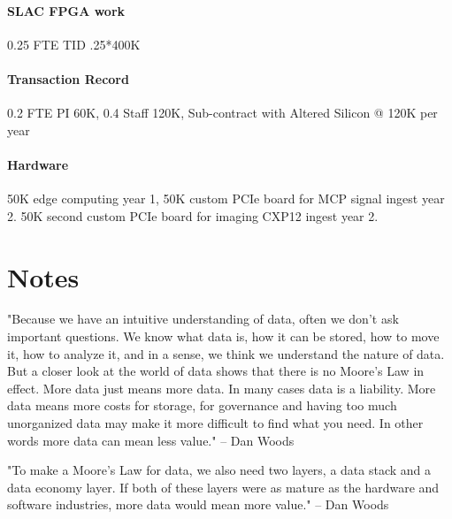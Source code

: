 \documentclass{article}
\begin{document}
\paragraph{SLAC FPGA work} 0.25 FTE TID .25*400K
\paragraph{Transaction Record} 0.2 FTE PI 60K, 0.4 Staff 120K, Sub-contract with Altered Silicon @ 120K per year
\paragraph{Hardware} 50K edge computing year 1, 50K custom PCIe board for MCP signal ingest year 2.  50K second custom PCIe board for imaging CXP12 ingest year 2.











\pagebreak
\section{Notes}




















"Because we have an intuitive understanding of data, often we don’t ask important questions. We
know what data is, how it can be stored, how to move it, how to analyze it, and in a sense, we
think we understand the nature of data.
But a closer look at the world of data shows that there is no Moore’s Law in effect. More data
just means more data. In many cases data is a liability. More data means more costs for storage,
for governance and having too much unorganized data may make it more difficult to find what
you need. In other words more data can mean less value." -- Dan Woods \cite{Woods2013}

"To make a Moore’s Law for data, we also need two layers, a data stack and a data economy layer. If both of these layers were as mature as the hardware and software industries, more data would
mean more value." -- Dan Woods \cite{Woods2013} %
\end{document}
